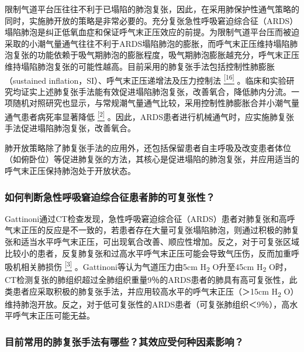限制气道平台压往往不利于已塌陷的肺泡复张，因此，在采用肺保护性通气策略的同时，实施肺开放的策略是非常必要的。充分复张急性呼吸窘迫综合征（ARDS）塌陷肺泡是纠正低氧血症和保证呼气末正压效应的前提。为限制气道平台压而被迫采取的小潮气量通气往往不利于ARDS塌陷肺泡的膨胀，而呼气末正压维持塌陷肺泡复张的功能依赖于吸气期肺泡的膨胀程度，吸气期肺泡膨胀越充分，呼气末正压维持塌陷肺泡复张的可能性越高。目前采用的肺复张手法包括控制性肺膨胀（sustained
inflation，SI）、呼气末正压递增法及压力控制法
\protect\hyperlink{text00011.htmlux5cux23ch16-10}{\textsuperscript{{[}16{]}}}
。临床和实验研究均证实上述肺复张手法能有效促进塌陷肺泡复张，改善氧合，降低肺内分流。一项随机对照研究也显示，与常规潮气量通气比较，采用控制性肺膨胀合并小潮气量通气患者病死率显著降低
\protect\hyperlink{text00011.htmlux5cux23ch2-10}{\textsuperscript{{[}2{]}}}
。因此，ARDS患者进行机械通气时，应实施肺复张手法促进塌陷肺泡复张，改善氧合。

肺开放策略除了肺复张手法的应用外，还包括保留患者自主呼吸及改变患者体位（如俯卧位）等促进肺复张的方法，其核心是促进塌陷的肺泡复张，并应用适当的呼气末正压保持肺泡处于开放状态。

\subsubsection{如何判断急性呼吸窘迫综合征患者肺的可复张性？}

Gattinoni通过CT检查发现，急性呼吸窘迫综合征（ARDS）患者对肺复张和高呼气末正压的反应是不一致的，若患者存在大量可复张塌陷肺泡，则通过积极的肺复张和适当水平呼气末正压，可出现氧合改善、顺应性增加。反之，对于可复张区域比较小的患者，反复肺复张和过高水平呼气末正压可能会导致气压伤，反而加重呼吸机相关肺损伤
\protect\hyperlink{text00011.htmlux5cux23ch3-10}{\textsuperscript{{[}3{]}}}
。Gattinoni等认为气道压力由5cm H\textsubscript{2} O升至45cm
H\textsubscript{2}
O时，CT检测复张的肺组织超过全肺组织重量9％的ARDS患者的肺具有高可复张性，此类患者应采取积极的肺复张手法，并应用较高水平的呼气末正压（＞15cm
H\textsubscript{2}
O）维持肺泡开放。反之，对于低可复张性的ARDS患者（可复张肺组织＜9％），高水平呼气末正压可能无益。

\subsubsection{目前常用的肺复张手法有哪些？其效应受何种因素影响？}

